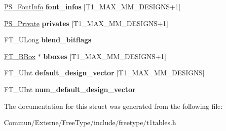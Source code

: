 \begin{DoxyCompactItemize}
\item 
\hyperlink{struct_p_s___font_info_rec__}{P\+S\+\_\+\+Font\+Info} {\bfseries font\+\_\+infos} \mbox{[}T1\+\_\+\+M\+A\+X\+\_\+\+M\+M\+\_\+\+D\+E\+S\+I\+G\+NS+1\mbox{]}\hypertarget{struct_p_s___blend_rec___ac5478cafc838257e693a9604edf1f5e9}{}\label{struct_p_s___blend_rec___ac5478cafc838257e693a9604edf1f5e9}

\item 
\hyperlink{struct_p_s___private_rec__}{P\+S\+\_\+\+Private} {\bfseries privates} \mbox{[}T1\+\_\+\+M\+A\+X\+\_\+\+M\+M\+\_\+\+D\+E\+S\+I\+G\+NS+1\mbox{]}\hypertarget{struct_p_s___blend_rec___a2b6e0c48d7a9c350b09f2943c1779ea4}{}\label{struct_p_s___blend_rec___a2b6e0c48d7a9c350b09f2943c1779ea4}

\item 
F\+T\+\_\+\+U\+Long {\bfseries blend\+\_\+bitflags}\hypertarget{struct_p_s___blend_rec___a86caa5319e208b4a2057db656bad9221}{}\label{struct_p_s___blend_rec___a86caa5319e208b4a2057db656bad9221}

\item 
\hyperlink{struct_f_t___b_box__}{F\+T\+\_\+\+B\+Box} $\ast$ {\bfseries bboxes} \mbox{[}T1\+\_\+\+M\+A\+X\+\_\+\+M\+M\+\_\+\+D\+E\+S\+I\+G\+NS+1\mbox{]}\hypertarget{struct_p_s___blend_rec___a30845d3cbd2e95a5f9cc867c7226af5e}{}\label{struct_p_s___blend_rec___a30845d3cbd2e95a5f9cc867c7226af5e}

\item 
F\+T\+\_\+\+U\+Int {\bfseries default\+\_\+design\+\_\+vector} \mbox{[}T1\+\_\+\+M\+A\+X\+\_\+\+M\+M\+\_\+\+D\+E\+S\+I\+G\+NS\mbox{]}\hypertarget{struct_p_s___blend_rec___a3ddacbda91fe0f9ef934a9e0afa6286f}{}\label{struct_p_s___blend_rec___a3ddacbda91fe0f9ef934a9e0afa6286f}

\item 
F\+T\+\_\+\+U\+Int {\bfseries num\+\_\+default\+\_\+design\+\_\+vector}\hypertarget{struct_p_s___blend_rec___afa5c7dd4206eb8a1d9ef4894abfc9555}{}\label{struct_p_s___blend_rec___afa5c7dd4206eb8a1d9ef4894abfc9555}

\end{DoxyCompactItemize}


The documentation for this struct was generated from the following file\+:\begin{DoxyCompactItemize}
\item 
Commun/\+Externe/\+Free\+Type/include/freetype/t1tables.\+h\end{DoxyCompactItemize}
